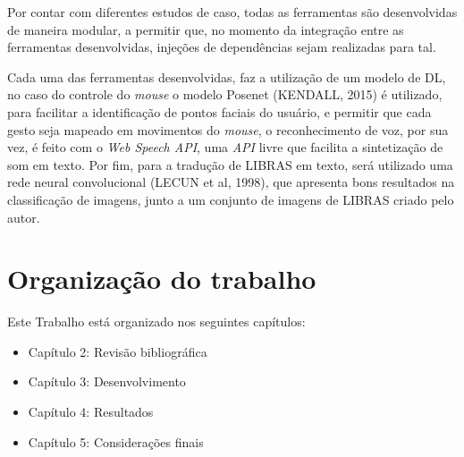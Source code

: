 Por contar com diferentes estudos de caso, todas as ferramentas são desenvolvidas de maneira modular, a permitir que, no momento da integração entre as ferramentas desenvolvidas, injeções de dependências sejam realizadas para tal.

Cada uma das ferramentas desenvolvidas, faz a utilização de um modelo de DL, no caso do controle do \textit{mouse} o modelo Posenet (KENDALL, 2015) é utilizado, para facilitar a identificação de pontos faciais do usuário, e permitir que cada gesto seja mapeado em movimentos do \textit{mouse}, o reconhecimento de voz, por sua vez, é feito com o \textit{Web Speech API}, uma \textit{API} livre que facilita a sintetização de som em texto. Por fim, para a tradução de LIBRAS em texto, será utilizado uma rede neural convolucional (LECUN et al, 1998), que apresenta bons resultados na classificação de imagens, junto a um conjunto de imagens de LIBRAS criado pelo autor.


\section{Organização do trabalho}

Este Trabalho está organizado nos seguintes capítulos:

\begin{itemize}
	\item Capítulo 2: Revisão bibliográfica %
	\item Capítulo 3: Desenvolvimento %
	\item Capítulo 4: Resultados %
	\item Capítulo 5: Considerações finais %
\end{itemize}
